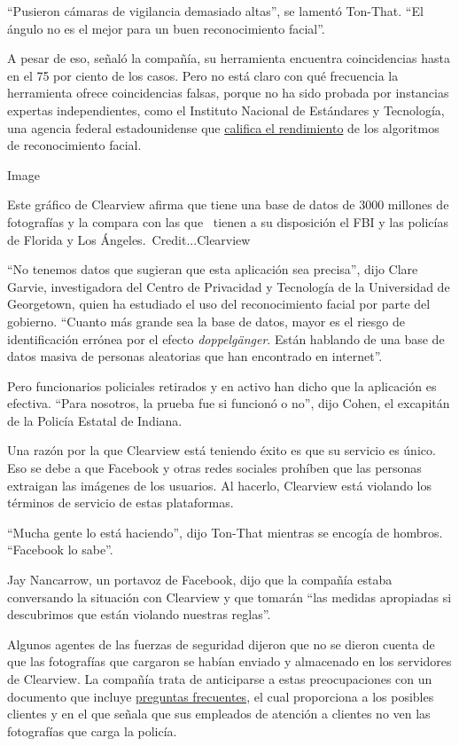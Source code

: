 ``Pusieron cámaras de vigilancia demasiado altas'', se lamentó Ton-That.
``El ángulo no es el mejor para un buen reconocimiento facial''.

A pesar de eso, señaló la compañía, su herramienta encuentra
coincidencias hasta en el 75 por ciento de los casos. Pero no está claro
con qué frecuencia la herramienta ofrece coincidencias falsas, porque no
ha sido probada por instancias expertas independientes, como el
Instituto Nacional de Estándares y Tecnología, una agencia federal
estadounidense que
\href{https://www.nist.gov/programs-projects/face-recognition-vendor-test-frvt-ongoing}{califica
el rendimiento} de los algoritmos de reconocimiento facial.

Image

Este gráfico de Clearview afirma que tiene una base de datos de 3000
millones de fotografías y la compara con las que~ tienen a su
disposición el FBI y las policías de Florida y Los
Ángeles.~Credit...Clearview

``No tenemos datos que sugieran que esta aplicación sea precisa'', dijo
Clare Garvie, investigadora del Centro de Privacidad y Tecnología de la
Universidad de Georgetown, quien ha estudiado el uso del reconocimiento
facial por parte del gobierno. ``Cuanto más grande sea la base de datos,
mayor es el riesgo de identificación errónea por el efecto
\emph{doppelgänger}. Están hablando de una base de datos masiva de
personas aleatorias que han encontrado en internet''.

Pero funcionarios policiales retirados y en activo han dicho que la
aplicación es efectiva. ``Para nosotros, la prueba fue si funcionó o
no'', dijo Cohen, el excapitán de la Policía Estatal de Indiana.

Una razón por la que Clearview está teniendo éxito es que su servicio es
único. Eso se debe a que Facebook y otras redes sociales prohíben que
las personas extraigan las imágenes de los usuarios. Al hacerlo,
Clearview está violando los términos de servicio de estas plataformas.

``Mucha gente lo está haciendo'', dijo Ton-That mientras se encogía de
hombros. ``Facebook lo sabe''.

Jay Nancarrow, un portavoz de Facebook, dijo que la compañía estaba
conversando la situación con Clearview y que tomarán ``las medidas
apropiadas si descubrimos que están violando nuestras reglas''.

Algunos agentes de las fuerzas de seguridad dijeron que no se dieron
cuenta de que las fotografías que cargaron se habían enviado y
almacenado en los servidores de Clearview. La compañía trata de
anticiparse a estas preocupaciones con un documento que incluye
\href{https://int.graylady3jvrrxbe.onion/data/documenthelper/6690-clearview-faq/c8b081a0bcca12e7903a/optimized/full.pdf\#page=1}{preguntas
frecuentes}, el cual proporciona a los posibles clientes y en el que
señala que sus empleados de atención a clientes no ven las fotografías
que carga la policía.

